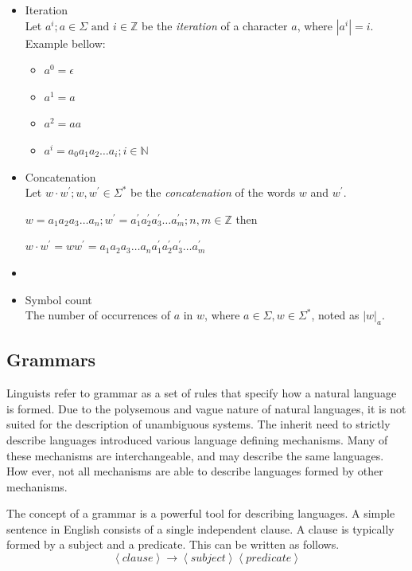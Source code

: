 \begin{itemize}
\item Iteration\\
  Let $a^i; a \in \Sigma \text{ and } i \in \mathbb{Z}$ be the \emph{iteration} of a character $a$, where $|a^i| = i$.\\
Example bellow:


\begin{itemize}
\item $a^0 = \epsilon$
\item $a^1 = a$
\item $a^2 = aa$
\item $a^i = a_0 a_1 a_2 \dots a_i; i \in \mathbb{N}$
\end{itemize}



\item Concatenation\\
  Let $w \cdot w^{'}; w, w^{'} \in \Sigma^{*}$ be the \emph{concatenation} of the words $w$ and $w^{'}$.

$w = a_1 a_2 a_3 \dots a_n ; w^{'} = a^{'}_1 a^{'}_2 a^{'}_3 \dots a^{'}_m; n,m \in \mathbb{Z}$ then  

$w\cdot w^{'} = w w^{'} = a_1 a_2 a_3 \dots a_n a^{'}_1 a^{'}_2 a^{'}_3 \dots a^{'}_m$


\item {}
\item Symbol count\\
The number of occurrences of $a$ in $w$, where $a \in \Sigma, w \in \Sigma^{*}$, noted as $|w|_{a}$.

\end{itemize}

\subsection{Grammars}
Linguists refer to grammar as a set of rules that specify how a natural language is formed. Due to the polysemous and vague nature of natural languages, it is not suited for the description of unambiguous systems. The inherit need to strictly describe languages introduced various language defining mechanisms. Many of these mechanisms are interchangeable, and may describe the same languages. How ever, not all mechanisms are able to describe languages formed by other mechanisms.

The concept of a grammar is a powerful tool for describing languages\cite[p. 52]{Linz2016Introduction}. A simple sentence in English consists of a single independent clause. A clause is typically formed by a subject and a predicate. This can be written as follows.
$$ \left< clause \right> \rightarrow \left< subject \right> \left< predicate \right> $$

